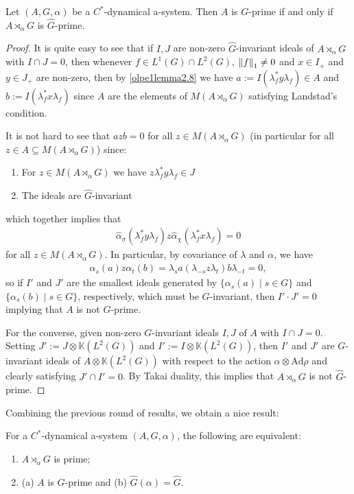 \begin{lemma}
	Let $(A, G, \alpha)$ be a $C^*$-dynamical a-system. Then $A$ is $G$-prime if and only if $A \rtimes_\alpha G$ is $\hat G$-prime.			
	\label{olpe1.5.7}
\end{lemma}
\begin{proof}
	It is quite easy to see that if $I,J$ are non-zero $\hat G$-invariant ideals of $A \rtimes_\alpha G$ with $I \cap J = 0$, then whenever $f \in L^1(G) \cap L^2(G)$, $\left\lVert f \right\rVert_1  \neq 0$ and $x \in I_+$ and $y \in J_+$ are non-zero, then by \cref{olpe1lemma2.8} we have $a := I(\lambda_f^* y \lambda_f) \in A$ and $b := I(\lambda_f^* x \lambda_f)$ since $A$ are the elements of $M(A \rtimes_\alpha G)$ satisfying Landstad's condition.
	
	It is not hard to see that $a z b = 0$ for all $z \in M(A \rtimes_\alpha G)$ (in particular for all $z \in A \subseteq M(A \rtimes_\alpha G)$) since:
	\begin{enumerate}[nosep]
		\item For $z \in M(A \rtimes_\alpha G)$ we have $z \lambda_f^* y \lambda_f \in J$
		\item The ideals are $\hat G$-invariant
	\end{enumerate}
	which together implies that 
	\begin{align*}
		\hat \alpha_{\sigma}(\lambda_f^* y \lambda_f) z \hat \alpha_{\chi}(\lambda_f^* x \lambda_f) = 0
	\end{align*}	
	for all $z \in M(A \rtimes_\alpha G)$. In particular, by covariance of $\lambda$ and $\alpha$, we have
	\begin{align*}
		\alpha_s(a) z \alpha_t(b) = \lambda_s a (\lambda_{-s} z \lambda_t) b \lambda_{-t}=0,
	\end{align*}
	so if $I'$ and $J'$ are the smallest ideals generated by $\{ \alpha_s(a) \mid s \in G\}$ and $\{ \alpha_s(b) \mid s \in G\}$, respectively, which must be $G$-invariant, then $I'\cdot J' = 0$ implying that $A$ is not $G$-prime.

	For the converse, given non-zero $G$-invariant ideals $I,J$ of $A$ with $I \cap J = 0$. Setting $J':=J \otimes \mathbb{K}(L^2(G))$ and $I':=I \otimes \mathbb{K}(L^2(G))$, then $I'$ and $J'$ are $G$-invariant ideals of $A \otimes \mathbb{K}(L^2(G))$ with respect to the action $\alpha \otimes \mathrm{Ad} \rho$ and clearly satisfying $ J'\cap I' = 0$. By Takai duality, this implies that $A \rtimes_\alpha G$ is not $\hat G$-prime. 
\end{proof}
Combining the previous round of results, we obtain a nice result:
\begin{corollary}
	For a $C^*$-dynamical a-system $(A,G,\alpha)$, the following are equivalent:
	\begin{enumerate}[nosep]
		\item $A \rtimes_\alpha G$ is prime;
		\item (a) $A$ is $G$-prime and (b) $\hat G(\alpha) = \hat G$.
	\end{enumerate}
	\label{olpe1.5.8}
\end{corollary}

